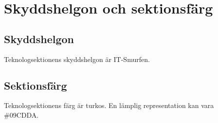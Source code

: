 \section{Skyddshelgon och sektionsfärg}

\subsection{Skyddshelgon}
Teknologsektionens skyddshelgon är IT-Smurfen.

\subsection{Sektionsfärg}
Teknologsektionens färg är turkos. En lämplig representation kan vara \#09CDDA.
